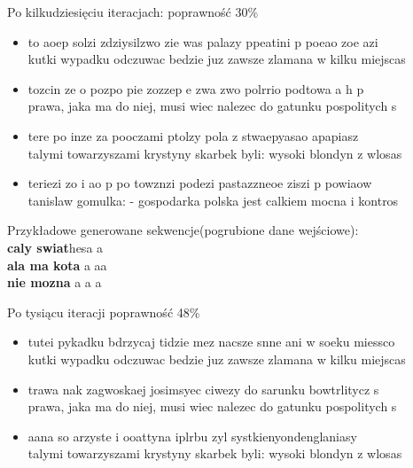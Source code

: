 \documentclass[11pt,leqno]{article}
\begin{document}
\begin{multicols}{2}
    Po kilkudziesięciu iteracjach: poprawność 30\% \\
    \begin{itemize}
        \item   to aoep solzi zdziysilzwo zie was palazy ppeatini p poeao zoe azi  \\
                kutki wypadku odczuwac bedzie juz zawsze  zlamana w kilku miejscas

        \item   tozcin ze o pozpo pie   zozzep e zwa     zwo polrrio podtowa a h p \\
                prawa, jaka ma do niej, musi wiec nalezec do gatunku pospolitych s

        \item   tere   po inze za   pooczami ptolzy  pola  z stwaepyasao apapiasz  \\
                talymi towarzyszami krystyny skarbek byli: wysoki blondyn z wlosas

        \item   teriezi  zo i ao  p po towznzi podezi pastazzneoe  ziszi p powiaow \\
                tanislaw gomulka: - gospodarka polska jest calkiem mocna i kontros
    \end{itemize}

    Przykładowe generowane sekwencje(pogrubione dane wejściowe): \\
    \textbf{caly swiat}hesa a\\
    \textbf{ala ma kota} a aa \\
    \textbf{nie mozna }a   a a

    \columnbreak
    Po tysiącu iteracji poprawność 48\% \\
    \begin{itemize}
        \item   tutei pykadku bdrzycaj tidzie mez nacsze snne ani w soeku miessco  \\
                kutki wypadku odczuwac bedzie juz zawsze  zlamana w kilku miejscas

        \item   trawa  nak  zagwoskaej  josimsyec ciwezy  do sarunku bowtrlitycz s \\
                prawa, jaka ma do niej, musi wiec nalezec do gatunku pospolitych s

        \item   aana   so arzyste i ooattyna iplrbu  zyl   systkienyondenglaniasy  \\
                talymi towarzyszami krystyny skarbek byli: wysoki blondyn z wlosas


\end{itemize}
\end{multicols}
\end{document}
